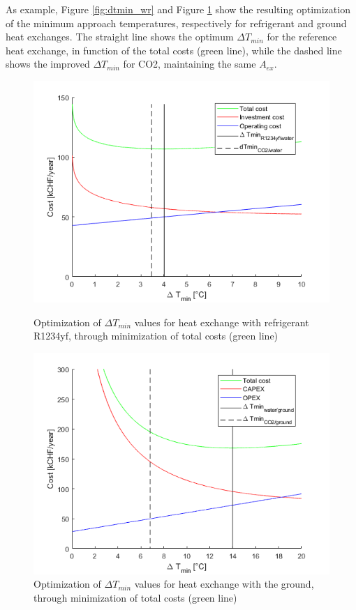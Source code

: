 \documentclass{article}
\begin{document}


As example, Figure \ref{fig:dtmin_wr} and Figure \ref{fig:dtmin_gtw} show the resulting optimization of the minimum approach temperatures, respectively for refrigerant and ground heat exchanges. The straight line shows the optimum $\Delta T_{min}$ for the reference heat exchange, in function of the total costs (green line), while the dashed line shows the improved $\Delta T_{min}$ for CO2, maintaining the same $A_{ex}$.

\begin{figure}[!htb]
	\centering
	\begin{minipage}{.45\textwidth}
		\centering
		\includegraphics[width=\linewidth]{dtmin_wr}
		\caption{Optimization of $\Delta T_{min}$ values for heat exchange with refrigerant R1234yf, through minimization of total costs (green line)}
		\label{fig:dtmin_wr}
	\end{minipage}%
	\hspace{1cm}
	\begin{minipage}{0.45\textwidth}
		\centering
		\includegraphics[width=\linewidth]{dtmin_gtw}
		\caption{Optimization of $\Delta T_{min}$ values for heat exchange with the ground, through minimization of total costs (green line)}
		\label{fig:dtmin_gtw}
	\end{minipage}
\end{figure}
\end{document}
